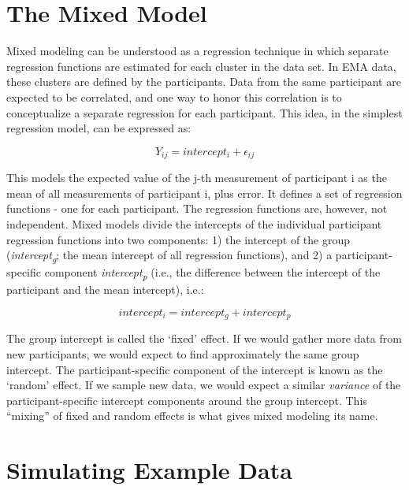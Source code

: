 \documentclass[]{book}
\begin{document}
\section{The Mixed Model}\label{the-mixed-model}

 

Mixed modeling can be understood as a regression technique in which
separate regression functions are estimated for each cluster in the data
set. In EMA data, these clusters are defined by the participants. Data
from the same participant are expected to be correlated, and one way to
honor this correlation is to conceptualize a separate regression for
each participant. This idea, in the simplest regression model, can be
expressed as:

\begin{equation} 
  Y_{ij} = intercept_{i} + \epsilon_{ij} 
\end{equation}

This models the expected value of the j-th measurement of participant i
as the mean of all measurements of participant i, plus error. It defines
a set of regression functions - one for each participant. The regression
functions are, however, not independent. Mixed models divide the
intercepts of the individual participant regression functions into two
components: 1) the intercept of the group
(\emph{intercept\textsubscript{g}}; the mean intercept of all regression
functions), and 2) a participant-specific component
\emph{intercept\textsubscript{p}} (i.e., the difference between the
intercept of the participant and the mean intercept), i.e.:

\begin{equation} 
  intercept_{i} = intercept_{g} + intercept_{p} 
\end{equation}

The group intercept is called the `fixed' effect. If we would gather
more data from new participants, we would expect to find approximately
the same group intercept. The participant-specific component of the
intercept is known as the `random' effect. If we sample new data, we
would expect a similar \emph{variance} of the participant-specific
intercept components around the group intercept. This ``mixing'' of
fixed and random effects is what gives mixed modeling its name.

\section{Simulating Example Data}\label{simulating-example-data}
\end{document}
